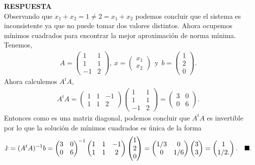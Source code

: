 \documentclass[11pt,letterpaper]{article}
\newcommand{\res}{\textbf{RESPUESTA}\\}
\newcommand{\finf}{\blacksquare.}
\begin{document}
\begin{enumerate}
\res Observando que $x_1+x_2=1\neq 2 =x_1+x_2$ podemos concluir que el sistema es inconsistente ya que no puede tomar dos valores distintos. Ahora ocupemos mínimos cuadrados para encontrar la mejor aproximación de norma mínima. Tenemos,
\begin{align*}
A=\begin{pmatrix}
1 & 1\\
1 & 1\\
-1 & 2
\end{pmatrix}, \ x=\begin{pmatrix}
x_1\\ x_2
\end{pmatrix} \ \ \text{y} \ \ b=\begin{pmatrix}
1 \\ 2 \\ 0
\end{pmatrix}.
\end{align*}
Ahora calculemos $A^tA$,
\begin{align*}
A^tA=\begin{pmatrix}
1 & 1 &-1\\
1 & 1 & 2
\end{pmatrix}\begin{pmatrix}
1 & 1\\
1 & 1\\
-1 & 2
\end{pmatrix}=\begin{pmatrix}
3 & 0 \\
0 & 6
\end{pmatrix}.
\end{align*}
Entonces como es una matriz diagonal, podemos concluir que $A^tA$ es invertible por lo que la solución de mínimos cuadrados es única de la forma 
\begin{align*}
\hat{x}=(A^tA)^{-1}b=\begin{pmatrix}
3 & 0 \\
0 & 6
\end{pmatrix}^{-1}\begin{pmatrix}
1 & 1 &-1\\
1 & 1 & 2
\end{pmatrix}\begin{pmatrix}
1 \\ 2 \\ 0
\end{pmatrix}=\begin{pmatrix}
1/3 & 0\\
0 & 1/6
\end{pmatrix}\begin{pmatrix}
3\\ 3
\end{pmatrix}=\bf \begin{pmatrix}
1\\ 1/2.
\end{pmatrix}. \ \ \ \finf
\end{align*}



\end{enumerate}
\end{document}
